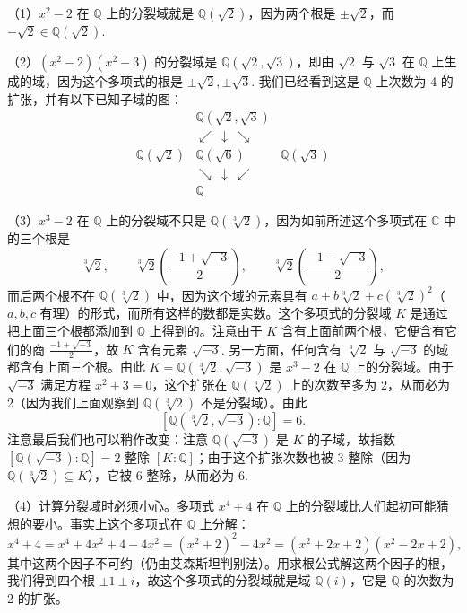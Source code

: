 \begin{example}
（1）\(x^2-2\) 在 \(\mathbb{Q}\) 上的分裂域就是 \(\mathbb{Q}(\sqrt{2})\)，因为两个根是 \(\pm\sqrt{2}\)，而 \(-\sqrt{2} \in \mathbb{Q}(\sqrt{2})\).

（2）\((x^2-2)(x^2-3)\) 的分裂域是 \(\mathbb{Q}(\sqrt{2}, \sqrt{3})\)，即由 \(\sqrt{2}\) 与 \(\sqrt{3}\) 在 \(\mathbb{Q}\) 上生成的域，因为这个多项式的根是 \(\pm\sqrt{2}, \pm\sqrt{3}\). 我们已经看到这是 \(\mathbb{Q}\) 上次数为 4 的扩张，并有以下已知子域的图：
\[
\begin{array}{ccc}
& \mathbb{Q}(\sqrt{2}, \sqrt{3}) & \\
& \swarrow\ \downarrow\ \searrow & \\
\mathbb{Q}(\sqrt{2}) & \mathbb{Q}(\sqrt{6}) & \mathbb{Q}(\sqrt{3})\\
& \searrow\ \downarrow\ \swarrow & \\
& \mathbb{Q} &
\end{array}
\]

（3）\(x^3-2\) 在 \(\mathbb{Q}\) 上的分裂域不只是 \(\mathbb{Q}(\sqrt[3]{2})\)，因为如前所述这个多项式在 \(\mathbb{C}\) 中的三个根是
\[
\sqrt[3]{2}, \qquad \sqrt[3]{2}\left(\frac{-1+\sqrt{-3}}{2}\right), \qquad \sqrt[3]{2}\left(\frac{-1-\sqrt{-3}}{2}\right),
\]
而后两个根不在 \(\mathbb{Q}(\sqrt[3]{2})\) 中，因为这个域的元素具有 \(a+b\sqrt[3]{2}+c(\sqrt[3]{2})^2\)（\(a, b, c\) 有理）的形式，而所有这样的数都是实数。这个多项式的分裂域 \(K\) 是通过把上面三个根都添加到 \(\mathbb{Q}\) 上得到的。注意由于 \(K\) 含有上面前两个根，它便含有它们的商 \(\frac{-1+\sqrt{-3}}{2}\)，故 \(K\) 含有元素 \(\sqrt{-3}\). 另一方面，任何含有 \(\sqrt[3]{2}\) 与 \(\sqrt{-3}\) 的域都含有上面三个根。由此 \(K = \mathbb{Q}(\sqrt[3]{2}, \sqrt{-3})\) 是 \(x^3-2\) 在 \(\mathbb{Q}\) 上的分裂域。由于 \(\sqrt{-3}\) 满足方程 \(x^2+3 = 0\)，这个扩张在 \(\mathbb{Q}(\sqrt[3]{2})\) 上的次数至多为 2，从而必为 2（因为我们上面观察到 \(\mathbb{Q}(\sqrt[3]{2})\) 不是分裂域）。由此
\[
[\mathbb{Q}(\sqrt[3]{2}, \sqrt{-3}):\mathbb{Q}] = 6.
\]
注意最后我们也可以稍作改变：注意 \(\mathbb{Q}(\sqrt{-3})\) 是 \(K\) 的子域，故指数 \([\mathbb{Q}(\sqrt{-3}):\mathbb{Q}] = 2\) 整除 \([K:\mathbb{Q}]\)；由于这个扩张次数也被 3 整除（因为 \(\mathbb{Q}(\sqrt[3]{2}) \subseteq K\)），它被 6 整除，从而必为 6.

（4）计算分裂域时必须小心。多项式 \(x^4+4\) 在 \(\mathbb{Q}\) 上的分裂域比人们起初可能猜想的要小。事实上这个多项式在 \(\mathbb{Q}\) 上分解：
\[
x^4+4 = x^4+4x^2+4-4x^2 = (x^2+2)^2-4x^2 = (x^2+2x+2)(x^2-2x+2),
\]
其中这两个因子不可约（仍由艾森斯坦判别法）。用求根公式解这两个因子的根，我们得到四个根 \(\pm1\pm i\)，故这个多项式的分裂域就是域 \(\mathbb{Q}(i)\)，它是 \(\mathbb{Q}\) 的次数为 2 的扩张。
\end{example}

